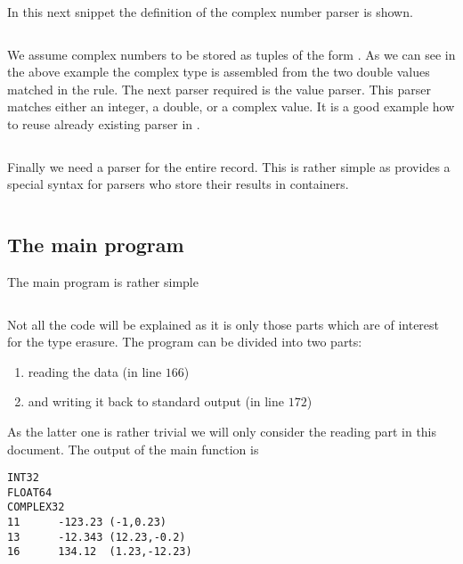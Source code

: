 In this next snippet the definition of the complex number parser is shown. 
\inputminted[linenos,
             fontsize=\small,
             firstnumber=45,
             firstline=45,
             lastline=61,
             frame=lines,
             label=examples/type\_erasure\_record.cpp
             ]
{cpp}{../examples/type_erasure_record.cpp}
We assume complex numbers to be stored as tuples of the form . As we can see in the above example the complex type is
assembled from the two double values matched in the rule. The next parser
required is the value parser. This parser matches either an integer, a double,
or a complex value. It is a good example how to reuse already existing 
parser in . 
\inputminted[linenos,
             fontsize=\small,
             firstnumber=66,
             firstline=66,
             lastline=89,
             frame=lines,
             label=examples/type\_erasure\_record.cpp
             ]
{cpp}{../examples/type_erasure_record.cpp}
Finally we need a parser for the entire record. This is rather simple as
 provides a special syntax for parsers who store their
results in containers.
\inputminted[linenos,
             fontsize=\small,
             firstnumber=94,
             firstline=94,
             lastline=107,
             frame=lines,
             label=examples/type\_erasure\_record.cpp
             ]
{cpp}{../examples/type_erasure_record.cpp}

\subsection{The main program}

The main program is rather simple 
\inputminted[linenos,
             fontsize=\small,
             firstnumber=162,
             firstline=162,
             lastline=175,
             frame=lines,
             label=examples/type\_erasure\_record.cpp
             ]
{cpp}{../examples/type_erasure_record.cpp}
Not all the code will be explained as it is only those parts which are of
interest for the  type erasure.
The program can be divided into two parts:
\begin{enumerate}
\item reading the data (in line $166$) 
\item and writing it back to standard output (in line $172$)
\end{enumerate}
As the latter one is rather trivial we will only consider the reading part in
this document. The output of the main function is 
\begin{verbatim}
INT32
FLOAT64
COMPLEX32
11      -123.23 (-1,0.23)
13      -12.343 (12.23,-0.2)
16      134.12  (1.23,-12.23)
\end{verbatim}

